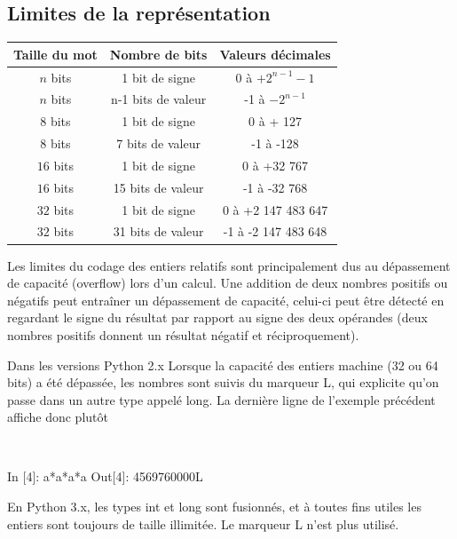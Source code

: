 \documentclass[10pt,fleqn]{article} %
\begin{document}
\subsection{Limites de la représentation}
\begin{center}
\begin{tabular}{|c|c|c|}
\hline
Taille du mot & Nombre de bits & Valeurs décimales \\
\hline
$n$ bits & 1 bit de signe & 0 à $+2^{n-1}-1$ \\
$n$ bits & n-1 bits de valeur & -1 à $-2^{n-1}$ \\ \hline
$8$ bits & 1 bit de signe & 0 à + 127 \\
$8$ bits & 7 bits de valeur & -1 à -128 \\ \hline
$16$ bits & 1 bit de signe & 0 à +32 767 \\
$16$ bits & 15 bits de valeur & -1 à -32 768 \\ \hline
$32$ bits & 1 bit de signe & 0 à +2 147 483 647 \\
$32$ bits & 31 bits de valeur & -1 à -2 147 483 648 \\ \hline
\end{tabular}
\end{center}

Les limites du codage des entiers relatifs sont principalement dus au dépassement de capacité (overflow) lors d’un calcul. Une addition de deux nombres positifs ou négatifs peut entraîner un dépassement de capacité, celui-ci peut être détecté en regardant le signe du résultat par rapport au signe des deux opérandes (deux nombres positifs donnent un résultat négatif et réciproquement).

\begin{rem}
Dans les versions Python 2.x
Lorsque la capacité des entiers machine (32 ou 64 bits) a été dépassée, les nombres sont
suivis du marqueur L, qui explicite qu’on passe dans un autre type appelé long. La dernière
ligne de l’exemple précédent affiche donc plutôt
\begin{py}
$\;$
\begin{python}[H]
In [4]: a*a*a*a
Out[4]: 4569760000L
\end{python}
\end{py}
En Python 3.x, les types int et long sont fusionnés, et à toutes fins utiles les entiers sont
toujours de taille illimitée. Le marqueur L n’est plus utilisé.
\end{rem}
\end{document}
